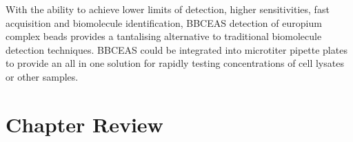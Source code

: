 With the ability to achieve lower limits of detection, higher sensitivities,
fast acquisition and biomolecule identification, \ac{BBCEAS} detection of
europium complex beads provides a tantalising alternative to traditional
biomolecule detection techniques. \ac{BBCEAS} could be integrated into
microtiter pipette plates to provide an all in one solution for rapidly
testing concentrations of cell lysates or other samples.

\section*{Chapter Review}
